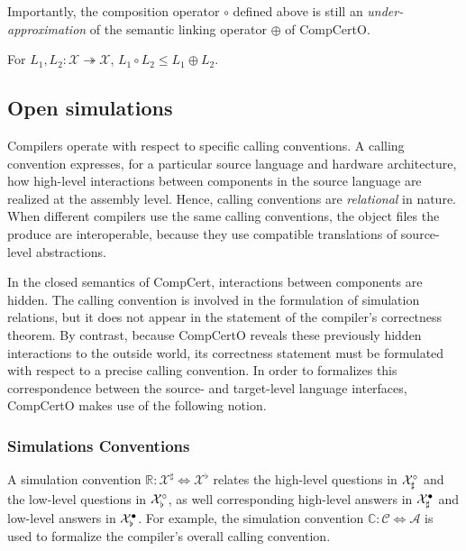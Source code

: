 \documentclass[acmsmall,review,anonymous]{acmart}\settopmatter{printfolios=true,printccs=false,printacmref=false}
\begin{document}
Importantly,
the composition operator $\circ$ defined above
is still an \emph{under-approximation}
of the semantic linking operator $\oplus$ of CompCertO.

\begin{theorem}
For $L_1, L_2 : \mathcal{X} \twoheadrightarrow \mathcal{X}$,
$
  L_1 \circ L_2
  \le
  L_1 \oplus L_2
$.
\end{theorem}



\subsection{Open simulations} %

Compilers operate with respect to specific calling conventions.
A calling convention expresses,
for a particular source language and hardware architecture,
how high-level interactions between components in the source language
are realized at the assembly level.
Hence, calling conventions are \emph{relational} in nature.
When different compilers use the same calling conventions,
the object files the produce are interoperable,
because they use compatible translations
of source-level abstractions.

In the closed semantics of CompCert,
interactions between components are hidden.
The calling convention is involved in the formulation
of simulation relations,
but it does not appear in the statement
of the compiler's correctness theorem.
By contrast,
because CompCertO reveals these previously hidden interactions
to the outside world,
its correctness statement
must be formulated with respect to a precise calling convention.
In order to formalizes this correspondence between
the source- and target-level language interfaces,
CompCertO makes use of the following notion.

\subsubsection{Simulations Conventions} %

A simulation convention
$\mathbb{R} : \mathcal{X}^\sharp \Leftrightarrow \mathcal{X}^\flat$
relates
the high-level questions in $\mathcal{X}_\sharp^\circ$ and
the low-level questions in $\mathcal{X}_\flat^\circ$,
as well corresponding
high-level answers in $\mathcal{X}_\sharp^\bullet$ and
low-level answers in $\mathcal{X}_\flat^\bullet$.
For example,
the simulation convention
$\mathbb{C} : \mathcal{C} \Leftrightarrow \mathcal{A}$
is used to formalize the compiler's
overall calling convention.
\end{document}

